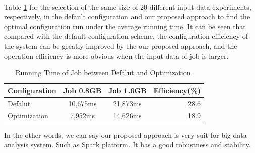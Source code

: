     ~ %
    ~ %

\par Table \ref{tab:runningtimecompare} for the selection of the same size of 20 different input data experiments, respectively, in the default configuration and our proposed approach to find the optimal configuration run under the average running time. It can be seen that compared with the default configuration scheme, the configuration efficiency of the system can be greatly improved by the our proposed approach, and the operation efficiency is more obvious when the input data of job is larger. 
\begin{table}[htbp!]
\centering
\caption{Running Time of Job between Defalut and Optimization.} \label{tab:runningtimecompare} 
\begin{center}
    \begin{tabular}{l*{2}{c}r}
    \hline
    Configuration & Job 0.8GB & Job 1.6GB & Efficiency(\%) \\
    \hline
    Defalut & 10,675ms & 21,873ms & 28.6 \\
    Optimization & 7,952ms & 14,626ms & 18.9  \\
    \hline
    \end{tabular}
\end{center}
\end{table}

\par   In the other words, we can say our proposed approach is very suit for big data analysis system. Such as Spark platform. It has a good robustness and stability.

